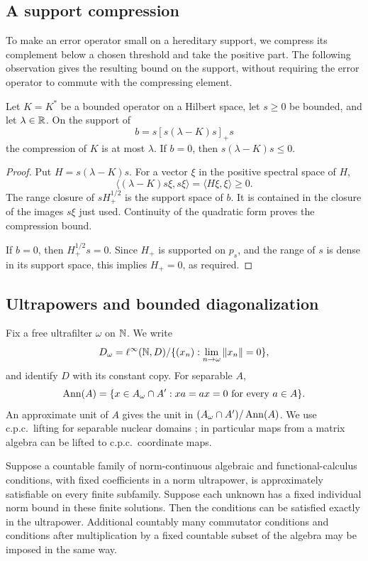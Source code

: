 \subsection{A support compression}

To make an error operator small on a hereditary support, we compress its
complement below a chosen threshold and take the positive part. The
following observation gives the resulting bound on the support, without
requiring the error operator to commute with the compressing element.

\begin{lemma}
\label{lem:support}
Let \(K=K^*\) be a bounded operator on a Hilbert space, let \(s\ge0\)
be bounded, and let \(\lambda\in\mathbb R\). On the support of
\[
 b=s[s(\lambda-K)s]_+s
\]
the compression of \(K\) is at most \(\lambda\).
If \(b=0\), then \(s(\lambda-K)s\le0\).
\end{lemma}

\begin{proof}
Put \(H=s(\lambda-K)s\). For a vector \(\xi\) in the positive spectral
space of \(H\),
\[
 \langle(\lambda-K)s\xi,s\xi\rangle
       =\langle H\xi,\xi\rangle\ge0.
\]
The range closure of \(sH_+^{1/2}\) is the support space of \(b\).
It is contained in the closure of the images \(s\xi\) just used.
Continuity of the quadratic form proves the compression bound.

If \(b=0\), then \(H_+^{1/2}s=0\). Since \(H_+\) is supported on
\(p_s\), and the range of \(s\) is dense in its support space, this implies
\(H_+=0\), as required.
\end{proof}

\subsection{Ultrapowers and bounded diagonalization}

Fix a free ultrafilter \(\omega\) on \(\mathbb N\). We write
\[
 D_\omega=\ell^\infty(\mathbb N,D)/
   \{(x_n):\lim_{n\to\omega}\|x_n\|=0\},
\]
and identify \(D\) with its constant copy. For separable \(A\),
\[
 \operatorname{Ann}(A)=\{x\in A_\omega\cap A':xa=ax=0
             \text{ for every }a\in A\}.
\]
An approximate unit of \(A\) gives the unit in
\((A_\omega\cap A')/\operatorname{Ann}(A)\).
We use c.p.c.\ lifting for separable nuclear domains
\cite[Theorem~3.10 and Corollary~3.11]{CE1976}; in particular maps from a matrix algebra can be lifted
to c.p.c.\ coordinate maps.

\begin{lemma}
\label{lem:diagonal}
Suppose a countable family of norm-continuous algebraic and
functional-calculus conditions, with fixed coefficients in a norm
ultrapower, is approximately satisfiable on every finite subfamily.
Suppose each unknown has a fixed individual norm bound in these
finite solutions. Then the conditions can be satisfied exactly in
the ultrapower. Additional countably many commutator conditions and
conditions after multiplication by a fixed countable subset of the
algebra may be imposed in the same way.
\end{lemma}

